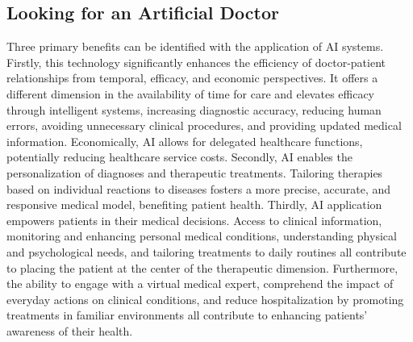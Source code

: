 \subsection{Looking for an Artificial Doctor}
Three primary benefits can be identified with the application of AI systems. Firstly, this technology significantly enhances the efficiency of doctor-patient relationships from temporal, efficacy, and economic perspectives. It offers a different dimension in the availability of time for care and elevates efficacy through intelligent systems, increasing diagnostic accuracy, reducing human errors, avoiding unnecessary clinical procedures, and providing updated medical information. Economically, AI allows for delegated healthcare functions, potentially reducing healthcare service costs.
\newline
Secondly, AI enables the personalization of diagnoses and therapeutic treatments. Tailoring therapies based on individual reactions to diseases fosters a more precise, accurate, and responsive medical model, benefiting patient health.
\newline
Thirdly, AI application empowers patients in their medical decisions. Access to clinical information, monitoring and enhancing personal medical conditions, understanding physical and psychological needs, and tailoring treatments to daily routines all contribute to placing the patient at the center of the therapeutic dimension.
\newline
Furthermore, the ability to engage with a virtual medical expert, comprehend the impact of everyday actions on clinical conditions, and reduce hospitalization by promoting treatments in familiar environments all contribute to enhancing patients' awareness of their health.


